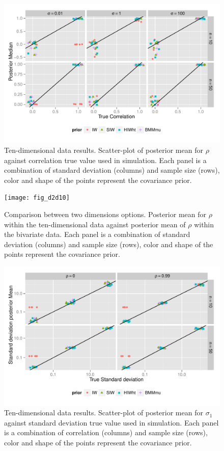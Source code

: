 \documentclass{article}
\begin{document}
\begin{figure}[hbpt]
   \centering
   \includegraphics[width=\textwidth]{fig_rho_d10} %
    \vspace{-.5in}
   \caption{ Ten-dimensional data results. Scatter-plot of posterior mean for $\rho$  against correlation true value used in simulation. Each panel is a combination of standard deviation (columns) and sample size (rows),  color and shape of the points represent the covariance prior. \label{rhod10} }
\end{figure}

\begin{figure}[hbpt]
   \centering
   \texttt{[image: fig\_d2d10]} %
    \vspace{-.5in}
   \caption{ Comparison between two dimensions options. Posterior mean for $\rho$ within the ten-dimensional data against posterior mean of $\rho$ within the bivariate data. Each panel is a combination of standard deviation (columns) and sample size (rows),  color and shape of the points represent the covariance prior.\label{d2d10} }
\end{figure}

\begin{figure}[htbp]
   \centering
   \includegraphics[width=\textwidth]{fig_s1_d10} 
    \vspace{-.5in}
   \caption{Ten-dimensional data results. Scatter-plot of posterior mean for $\sigma_1$  against standard deviation true value used in simulation. Each panel is a combination of correlation (columns) and sample size (rows),  color and shape of the points represent the covariance prior.  \label{devF2} }
\end{figure}
\end{document}
